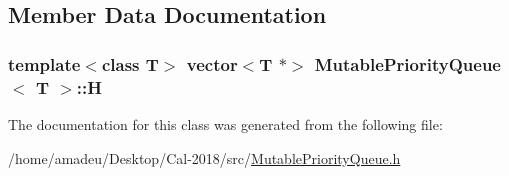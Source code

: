 \subsection{Member Data Documentation}
\subsubsection[{\texorpdfstring{H}{H}}]{\setlength{\rightskip}{0pt plus 5cm}template$<$class T$>$ vector$<$T $\ast$$>$ {\bf Mutable\+Priority\+Queue}$<$ T $>$\+::H\hspace{0.3cm}{\ttfamily [private]}}\hypertarget{classMutablePriorityQueue_a2c442cb8e2ff5cfa7562174dadc83fe7}{}\label{classMutablePriorityQueue_a2c442cb8e2ff5cfa7562174dadc83fe7}


The documentation for this class was generated from the following file\+:\begin{DoxyCompactItemize}
\item 
/home/amadeu/\+Desktop/\+Cal-\/2018/src/\hyperlink{MutablePriorityQueue_8h}{Mutable\+Priority\+Queue.\+h}\end{DoxyCompactItemize}
